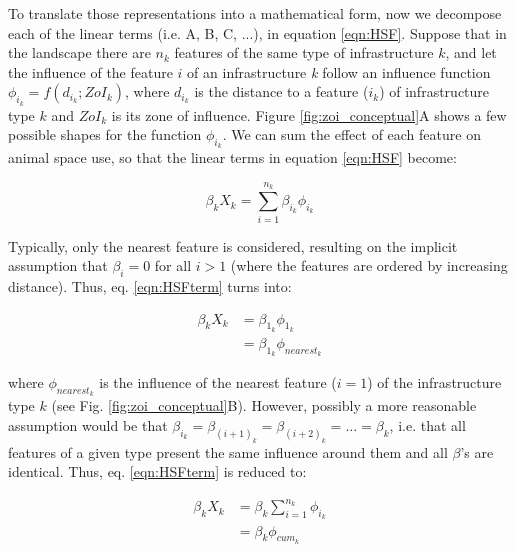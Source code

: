 \documentclass[titlepage]{article}
\begin{document}
To translate those representations into a mathematical form, now we decompose each of the linear terms (i.e. A, B, C, ...), in equation \ref{eqn:HSF}. Suppose that in the landscape there are $n_k$ features of the same type of infrastructure $k$, and let the influence of the feature $i$ of an infrastructure \textit{k} follow an influence function \citep[or ``weighting function", ][]{miguet_how_2017} $\phi_{i_k} = f(d_{i_k}; ZoI_k)$, where $d_{i_k}$ is the distance to a feature ($i_k$) of infrastructure type $k$ and $ZoI_k$ is its zone of influence. Figure \ref{fig:zoi_conceptual}A shows a few possible shapes for the function $\phi_{i_k}$. We can sum the effect of each feature on animal space use, so that the linear terms in equation \ref{eqn:HSF} become:

\begin{equation}
\label{eqn:HSFterm}
    \beta_k X_k = \sum_{i=1}^{n_k} \beta_{i_k} \phi_{i_k}
\end{equation}

Typically, only the nearest feature is considered, resulting on the implicit assumption that $\beta_i = 0$ for all $i > 1$ (where the features are ordered by increasing distance). Thus, eq. \ref{eqn:HSFterm} turns into:

\begin{equation}
\label{eqn:HSFnearest}
\begin{split}
    \beta_k X_k & = \beta_{1_k} \phi_{1_k} \\
                & = \beta_{1_k} \phi_{nearest_k}
\end{split}                
\end{equation}

where $\phi_{nearest_k}$ is the influence of the nearest feature ($i = 1$) of the infrastructure type $k$ (see Fig. \ref{fig:zoi_conceptual}B). However, possibly a more reasonable assumption would be that $\beta_{i_k} = \beta_{{(i+1)}_k} = \beta_{{(i+2)}_k} = ... = \beta_k$, i.e. that all features of a given type present the same influence around them and all $\beta$'s are identical. Thus, eq. \ref{eqn:HSFterm} is reduced to:

\begin{equation}
\label{eqn:HSFcuminf}
\begin{split}
    \beta_k X_k & = \beta_k \sum_{i=1}^{n_k} \phi_{i_k} \\
                & = \beta_k \phi_{cum_k}
\end{split}
\end{equation}
\end{document}
